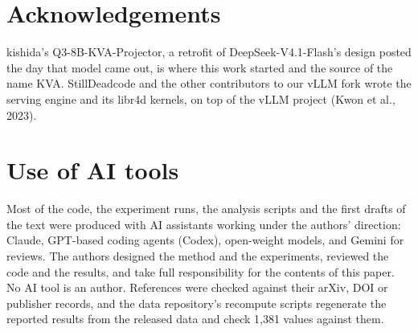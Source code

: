 \documentclass[11pt]{article}
\begin{document}
\FloatBarrier
\section*{Acknowledgements}
kishida's Q3-8B-KVA-Projector, a retrofit of DeepSeek-V4.1-Flash's design posted the day that model came out, is where this work started and the source of the name KVA. StillDeadcode and the other contributors to our vLLM fork wrote the serving engine and its libr4d kernels, on top of the vLLM project (Kwon et al., 2023).


\FloatBarrier
\section*{Use of AI tools}
Most of the code, the experiment runs, the analysis scripts and the first drafts of the text were produced with AI assistants working under the authors' direction: Claude, GPT-based coding agents (Codex), open-weight models, and Gemini for reviews. The authors designed the method and the experiments, reviewed the code and the results, and take full responsibility for the contents of this paper. No AI tool is an author. References were checked against their arXiv, DOI or publisher records, and the data repository's recompute scripts regenerate the reported results from the released data and check 1,381 values against them.


\FloatBarrier
\end{document}
